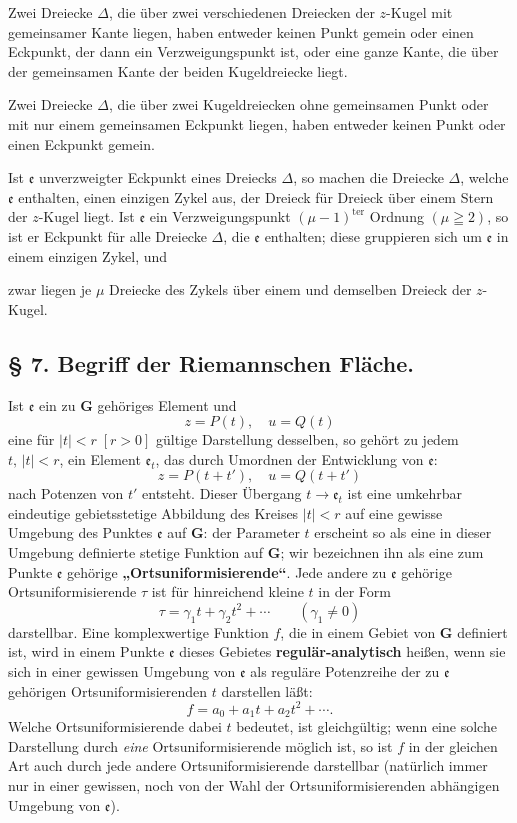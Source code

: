 \documentclass{article}
\begin{document}
Zwei Dreiecke $\Delta$, die über zwei verschiedenen Dreiecken der $z$-Kugel mit gemeinsamer Kante liegen, haben entweder keinen Punkt gemein oder einen Eckpunkt, der dann ein Verzweigungspunkt ist, oder eine ganze Kante, die über der gemeinsamen Kante der beiden Kugeldreiecke liegt.

Zwei Dreiecke $\Delta$, die über zwei Kugeldreiecken ohne gemeinsamen Punkt oder mit nur einem gemeinsamen Eckpunkt liegen, haben entweder keinen Punkt oder einen Eckpunkt gemein.

Ist $\mathfrak{e}$ unverzweigter Eckpunkt eines Dreiecks $\Delta$, so machen die Dreiecke $\Delta$, welche $\mathfrak{e}$ enthalten, einen einzigen Zykel aus, der Dreieck für Dreieck über einem Stern der $z$-Kugel liegt. Ist $\mathfrak{e}$ ein Verzweigungspunkt $(\mu - 1)^{\text{ter}}$ Ordnung $(\mu \geqq 2)$, so ist er Eckpunkt für alle Dreiecke $\Delta$, die $\mathfrak{e}$ enthalten; diese gruppieren sich um $\mathfrak{e}$ in einem einzigen Zykel, und

zwar liegen je $\mu$ Dreiecke des Zykels über einem und demselben Dreieck der $z$-Kugel.

\subsection*{§ 7. Begriff der Riemannschen Fläche.}

Ist $\mathfrak{e}$ ein zu $\mathbf{G}$ gehöriges Element und
\[ z = P(t), \quad u = Q(t) \]
eine für $|t| < r\;[r > 0]$ gültige Darstellung desselben, so gehört zu jedem $t,\,|t| < r$, ein Element $\mathfrak{e}_t$, das durch Umordnen der Entwicklung von $\mathfrak{e}$:
\[ z = P(t + t'), \quad u = Q(t + t') \]
nach Potenzen von $t'$ entsteht. Dieser Übergang $t \to \mathfrak{e}_t$ ist eine umkehrbar eindeutige gebietsstetige Abbildung des Kreises $|t| < r$ auf eine gewisse Umgebung des Punktes $\mathfrak{e}$ auf $\mathbf{G}$: der Parameter $t$ erscheint so als eine in dieser Umgebung definierte stetige Funktion auf $\mathbf{G}$; wir bezeichnen ihn als eine zum Punkte $\mathfrak{e}$ gehörige \textbf{„Ortsuniformisierende“}. Jede andere zu $\mathfrak{e}$ gehörige Ortsuniformisierende $\tau$ ist für hinreichend kleine $t$ in der Form
\[ \tau = \gamma_1 t + \gamma_2 t^2 + \cdots \qquad (\gamma_1 \neq 0) \]
darstellbar. Eine komplexwertige Funktion $f$, die in einem Gebiet von $\mathbf{G}$ definiert ist, wird in einem Punkte $\mathfrak{e}$ dieses Gebietes \textbf{regulär-analytisch} heißen, wenn sie sich in einer gewissen Umgebung von $\mathfrak{e}$ als reguläre Potenzreihe der zu $\mathfrak{e}$ gehörigen Ortsuniformisierenden $t$ darstellen läßt:
\[ f = a_0 + a_1 t + a_2 t^2 + \cdots. \]
Welche Ortsuniformisierende dabei $t$ bedeutet, ist gleichgültig; wenn eine solche Darstellung durch \emph{eine} Ortsuniformisierende möglich ist, so ist $f$ in der gleichen Art auch durch jede andere Ortsuniformisierende darstellbar (natürlich immer nur in einer gewissen, noch von der Wahl der Ortsuniformisierenden abhängigen Umgebung von $\mathfrak{e}$).
\end{document}
